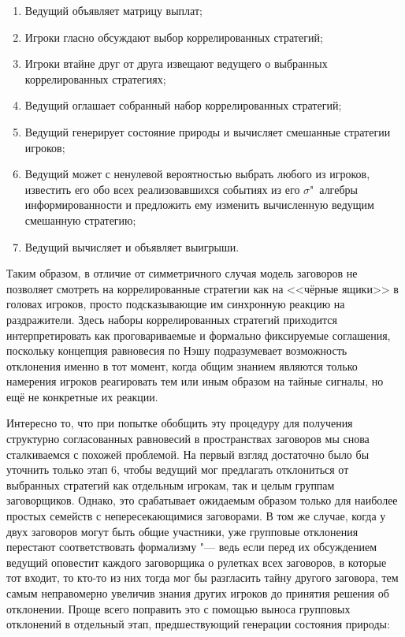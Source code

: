 \begin{enumerate}
	\item Ведущий объявляет матрицу выплат;
	\item Игроки гласно обсуждают выбор коррелированных стратегий;
	\item Игроки втайне друг от друга извещают ведущего о выбранных коррелированных стратегиях;
	\item Ведущий оглашает собранный набор коррелированных стратегий;
	\item Ведущий генерирует состояние природы и вычисляет смешанные стратегии игроков;
	\item Ведущий может с ненулевой вероятностью выбрать любого из игроков, известить его обо всех реализовавшихся событиях из его $\sigma$"~алгебры информированности и предложить ему изменить вычисленную ведущим смешанную стратегию;
	\item Ведущий вычисляет и объявляет выигрыши.
\end{enumerate}

Таким образом, в отличие от симметричного случая модель заговоров не позволяет смотреть на коррелированные стратегии как на <<чёрные ящики>> в головах игроков, просто подсказывающие им синхронную реакцию на раздражители. Здесь наборы коррелированных стратегий приходится интерпретировать как проговариваемые и формально фиксируемые соглашения, поскольку концепция равновесия по Нэшу подразумевает возможность отклонения именно в тот момент, когда общим знанием являются только намерения игроков реагировать тем или иным образом на тайные сигналы, но ещё не конкретные их реакции.

Интересно то, что при попытке обобщить эту процедуру для получения структурно согласованных равновесий в пространствах заговоров мы снова сталкиваемся с похожей проблемой. На первый взгляд достаточно было бы уточнить только этап 6, чтобы ведущий мог предлагать отклониться от выбранных стратегий как отдельным игрокам, так и целым группам заговорщиков. Однако, это срабатывает ожидаемым образом только для наиболее простых семейств с непересекающимися заговорами. В том же случае, когда у двух заговоров могут быть общие участники, уже групповые отклонения перестают соответствовать формализму "--- ведь если перед их обсуждением ведущий оповестит каждого заговорщика о рулетках всех заговоров, в которые тот входит, то кто-то из них тогда мог бы разгласить тайну другого заговора, тем самым неправомерно увеличив знания других игроков до принятия решения об отклонении. Проще всего поправить это с помощью выноса групповых отклонений в отдельный этап, предшествующий генерации состояния природы:


